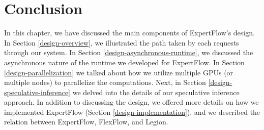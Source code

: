 \section{Conclusion}
In this chapter, we have discussed the main components of ExpertFlow's design. In Section \ref{design-overview}, we illustrated the path taken by each requests through our system. In Section \ref{design-asynchronous-runtime}, we discussed the asynchronous nature of the runtime we developed for ExpertFlow. In Section \ref{design-parallelization} we talked about how we utilize multiple GPUs (or multiple nodes) to parallelize the computations. Next, in Section \ref{design-speculative-inference} we delved into the details of our speculative inference approach.
In addition to discussing the design, we offered more details on how we implemented ExpertFlow (Section \ref{design-implementation}), and we described the relation between ExpertFlow, FlexFlow, and Legion.